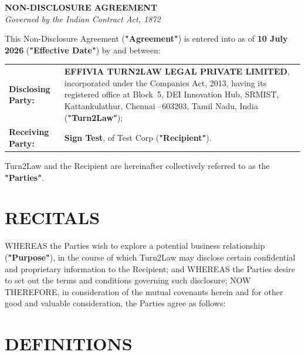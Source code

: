 \documentclass[10pt]{article}
\begin{document}
\thispagestyle{empty}

\begin{center}
  {\fontsize{15pt}{19pt}\selectfont\textbf{NON-DISCLOSURE AGREEMENT}}\\[4pt]
  {\fontsize{9pt}{12pt}\selectfont\textit{Governed by the Indian Contract Act, 1872}}
\end{center}

\vspace{10pt}
\noindent This Non-Disclosure Agreement (\textbf{"Agreement"}) is entered into as of \textbf{10 July 2026} (\textbf{"Effective Date"}) by and between:

\vspace{8pt}
\begin{tabularx}{\textwidth}{@{}lX@{}}
\textbf{Disclosing Party:} &
\textbf{EFFIVIA TURN2LAW LEGAL PRIVATE LIMITED}, incorporated under the Companies Act, 2013, having its registered office at Block~5, DEI Innovation Hub, SRMIST, Kattankulathur, Chennai\,--\,603203, Tamil Nadu, India (\textbf{"Turn2Law"});\\[6pt]
\textbf{Receiving Party:} &
\textbf{Sign Test}, of Test Corp (\textbf{"Recipient"}).\\
\end{tabularx}

\vspace{6pt}
\noindent Turn2Law and the Recipient are hereinafter collectively referred to as the \textbf{"Parties"}.

\section*{RECITALS}

WHEREAS the Parties wish to explore a potential business relationship (\textbf{"Purpose"}), in the course of which Turn2Law may disclose certain confidential and proprietary information to the Recipient; and WHEREAS the Parties desire to set out the terms and conditions governing such disclosure; NOW THEREFORE, in consideration of the mutual covenants herein and for other good and valuable consideration, the Parties agree as follows:

\section{DEFINITIONS}
\end{document}
